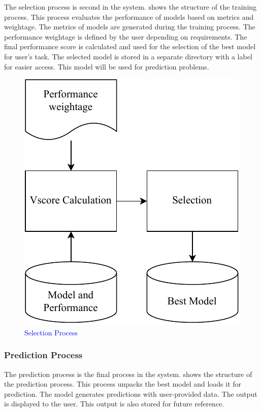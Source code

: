 \documentclass[a4paper,fleqn]{cas-dc}
\newcommand{\responsemodsm}[1]{\textcolor{blue}{#1}}
\newcommand{\captionb}[1]{\caption{\responsemodsm{#1}}}
\begin{document}
The selection process is second in the system.  shows the structure of the training process. This process evaluates the performance of models based on metrics and weightage. The metrics of models are generated during the training process. The performance weightage is defined by the user depending on requirements. The final performance score is calculated and used for the selection of the best model for user's task. The selected model is stored in a separate directory with a label for easier access. This model will be used for prediction problems.

\begin{figure}[ht]
    \centering
    \includegraphics[width=0.7\columnwidth]{selection.pdf}
    \captionb{Selection Process}
    \label{fig:selection_process}
\end{figure}

\subsubsection{Prediction Process}\label{subsubsec:prediction_process}

The prediction process is the final process in the system.  shows the structure of the prediction process. This process unpacks the best model and loads it for prediction. The model generates predictions with user-provided data. The output is displayed to the user. This output is also stored for future reference.
\end{document}
